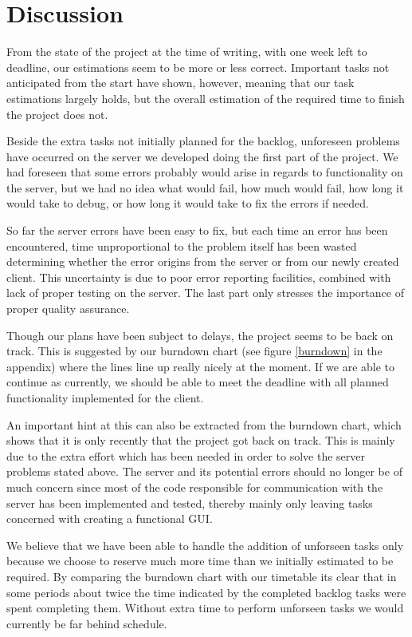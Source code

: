 \section{Discussion}
From the state of the project at the time of writing, with one week left to deadline, our estimations seem to be more or less correct. Important tasks not anticipated from the start have shown, however, meaning that our task estimations largely holds, but the overall estimation of the required time to finish the project does not.

Beside the extra tasks not initially planned for the backlog, unforeseen problems have occurred on the server we developed doing the first part of the project. We had foreseen that some errors probably would arise in regards to functionality on the server, but we had no idea what would fail, how much would fail, how long it would take to debug, or how long it would take to fix the errors if needed.

So far the server errors have been easy to fix, but each time an error has been encountered, time unproportional to the problem itself has been wasted determining whether the error origins from the server or from our newly created client.
This uncertainty is due to poor error reporting facilities, combined with lack of proper testing on the server. The last part only stresses the importance of proper quality assurance.

Though our plans have been subject to delays, the project seems to be back on track. This is suggested by our burndown chart (see figure \ref{burndown} in the appendix) where the lines line up really nicely at the moment. If we are able to continue as currently, we should be able to meet the deadline with all planned functionality implemented for the client.

An important hint at this can also be extracted from the burndown chart, which shows that it is only recently that the project got back on track. This is mainly due to the extra effort which has been needed in order to solve the server problems stated above.
The server and its potential errors should no longer be of much concern since most of the code responsible for communication with the server has been implemented and tested, thereby mainly only leaving tasks concerned with creating a functional GUI.

We believe that we have been able to handle the addition of unforseen tasks only because we choose to reserve much more time than we initially estimated to be required. By comparing
the burndown chart with our timetable its clear that in some periods about twice the time  indicated by the completed backlog tasks were spent completing them. Without extra time to perform unforseen tasks we would currently be far behind schedule.

